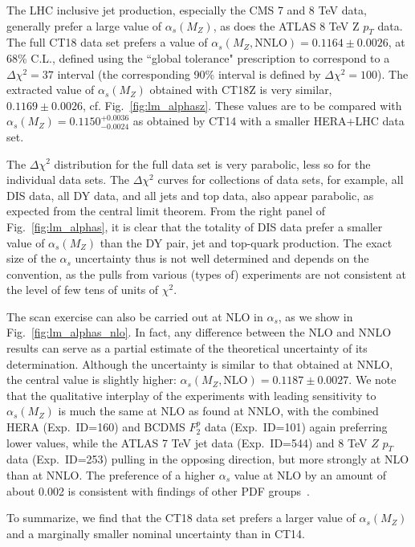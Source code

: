 The LHC inclusive jet production, especially the CMS 7 and 8 TeV data, generally prefer a large value of $\alpha_s(M_Z)$, as
does the ATLAS 8 TeV Z $p_T$ data. The full CT18 data set prefers a value of $\alpha_s(M_Z, \mbox{NNLO})=0.1164 \pm 0.0026$, at 68\% C.L., defined using the ``global tolerance" prescription to correspond to a $\Delta \chi^2\! =\! 37$ interval
(the corresponding 90\% interval is defined by $\Delta \chi^2\! =\! 100$). The extracted value of $\alpha_s(M_Z)$ obtained with CT18Z is very similar, $0.1169\pm0.0026$, cf. Fig.~\ref{fig:lm_alphasz}. These values are to be
compared with $\alpha_s(M_Z)\!=\!0.1150^{+0.0036}_{-0.0024}$ as obtained by CT14 with a smaller HERA+LHC data set. 

The $\Delta\chi^2$ distribution for the full data set is very
parabolic, less so for the individual data sets. The $\Delta\chi^2$
curves for collections of data sets, for example, all DIS data, all DY
data, and all jets and top data, also appear parabolic, as expected
from the central limit theorem. From the right panel of
Fig.~\ref{fig:lm_alphas}, it is clear that the totality of DIS data
prefer a smaller value of $\alpha_s(M_Z)$  than the DY pair, jet and
top-quark production.  
The exact size of the $\alpha_s$ uncertainty thus is not well
determined and depends on the convention, as the pulls from various
(types of) experiments are not consistent at the level of few tens of
units of $\chi^2$.  

The scan exercise can also be carried out at NLO in $\alpha_s$, as we show in Fig.~\ref{fig:lm_alphas_nlo}. In fact, any difference between the NLO and NNLO results can serve as a partial estimate of the
theoretical uncertainty of its determination. Although the uncertainty is similar to that obtained at NNLO, the central value is slightly higher: $\alpha_s(M_Z,\mbox{NLO})=0.1187\pm 0.0027$. We note that the qualitative interplay of the experiments with leading sensitivity to $\alpha_s(M_Z)$ is much the same at NLO as
found at NNLO, with the combined HERA (Exp.~ID=160) and BCDMS $F^p_2$ data (Exp.~ID=101) again preferring lower values, while the ATLAS 7 TeV jet data (Exp.~ID=544) and 8 TeV
$Z$ $p_T$ data (Exp.~ID=253) pulling in the opposing direction, but more strongly at NLO than at NNLO. The preference of a higher $\alpha_s$ value at NLO by an amount of about 0.002 is consistent with findings of other PDF groups~\cite{Ball:2011us,Harland-Lang:2015nxa,Abramowicz:2015mha,Alekhin:2017kpj}.

To summarize, we find that the CT18 data set prefers a larger value of $\alpha_{s}(M_Z)$ and a marginally smaller nominal uncertainty than in CT14.



